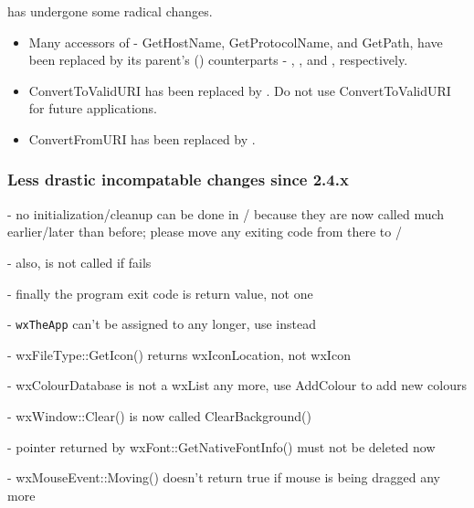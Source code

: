  has undergone some radical changes.

\begin{itemize}\itemsep=0pt
\item Many accessors of  - GetHostName, GetProtocolName, and GetPath,
      have been replaced by its parent's () counterparts - ,
      , and , respectively.

\item ConvertToValidURI has been replaced by .  Do not use
      ConvertToValidURI for future applications.

\item ConvertFromURI has been replaced by .
\end{itemize}



\subsubsection{Less drastic incompatable changes since 2.4.x}\label{24incompatiblelessdrastic}

- no initialization/cleanup can be done in / because they are
  now called much earlier/later than before; please move any exiting code
  from there to /

- also,  is not called if  fails

- finally the program exit code is  return value, not  one

- \texttt{wxTheApp} can't be assigned to any longer, use  instead

- wxFileType::GetIcon() returns wxIconLocation, not wxIcon

- wxColourDatabase is not a wxList any more, use AddColour to add new colours

- wxWindow::Clear() is now called ClearBackground()

- pointer returned by wxFont::GetNativeFontInfo() must not be deleted now

- wxMouseEvent::Moving() doesn't return true if mouse is being dragged any more

